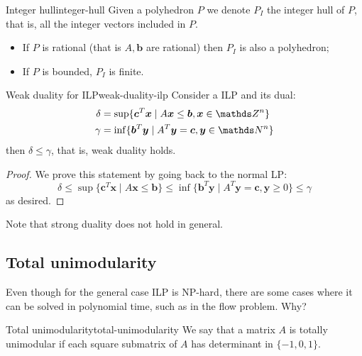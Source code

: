 \documentclass[12pt]{extarticle}
\renewcommand{\vec}[1]{\bm{#1}}
\begin{document}
\begin{definition}{Integer hull}{integer-hull}
	Given a polyhedron $P$ we denote $P_I$ the integer hull of $P$, that is,
	all the integer vectors included in $P$.
\end{definition}

\begin{remark}{}{}
	\begin{itemize}
		\item If $P$ is rational (that is $A, \vec b$ are rational) then $P_I$ is also a polyhedron;
		\item If $P$ is bounded, $P_I$ is finite.
	\end{itemize}
\end{remark}

\begin{proposition}{Weak duality for ILP}{weak-duality-ilp}
	Consider a ILP and its dual:
	\begin{align}
		\delta & = \sup \{\vec c^T \vec x \mid A \vec x \leq \vec b, \vec x \in \Z^n \} \\
		\gamma & = \inf \{\vec b^T \vec y \mid A^T \vec y = \vec c, \vec y \in \N^n \}
	\end{align}
	then $\delta \leq \gamma$, that is, weak duality holds.
\end{proposition}

\begin{proof}
	We prove this statement by going back to the normal LP:
	\begin{equation}
		\delta \leq \sup \{ \vec c^T \vec x \mid A \vec x \leq \vec b \}
		\leq \inf \{ \vec b^T \vec y \mid A^T \vec y = \vec c, \vec y \geq 0\} \leq \gamma
	\end{equation}
	as desired.
\end{proof}

Note that strong duality does not hold in general.

\subsection{Total unimodularity}

Even though for the general case ILP is NP-hard, there are some cases where it can be solved in
polynomial time, such as in the flow problem.
Why?

\begin{definition}{Total unimodularity}{total-unimodularity}
	We say that a matrix $A$ is totally unimodular if each square submatrix of $A$ has determinant in
	$\{-1, 0, 1\}$.
\end{definition}
\end{document}
